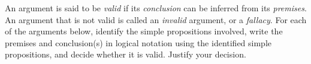 \documentclass[addpoints]{exam}
\begin{document}
\begin{questions}
\question An argument is said to be \textit{valid} if its \textit{conclusion} can be inferred from its \textit{premises}. An argument that is not valid is called an \textit{invalid} argument, or a \textit{fallacy}. For each of the arguments below, identify the simple propositions involved, write the premises and conclusion(s) in logical notation using the identified simple propositions, and decide whether it is valid. Justify your decision.
\end{questions}
\end{document}
